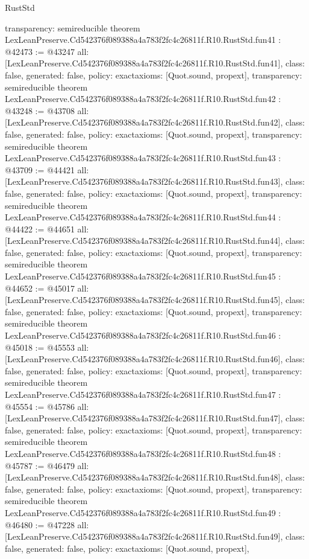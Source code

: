 \begin{lexlean}{RustStd}
\begin{coremodule}
{  transparency: semireducible
}
theorem LexLeanPreserve.Cd542376f089388a4a783f2fc4c26811f.R10.RustStd.fun41 : @42473 := @43247 {
  all: [LexLeanPreserve.Cd542376f089388a4a783f2fc4c26811f.R10.RustStd.fun41],
  class: false,
  generated: false,
  policy: exact{axioms: [Quot.sound, propext]},
  transparency: semireducible
}
theorem LexLeanPreserve.Cd542376f089388a4a783f2fc4c26811f.R10.RustStd.fun42 : @43248 := @43708 {
  all: [LexLeanPreserve.Cd542376f089388a4a783f2fc4c26811f.R10.RustStd.fun42],
  class: false,
  generated: false,
  policy: exact{axioms: [Quot.sound, propext]},
  transparency: semireducible
}
theorem LexLeanPreserve.Cd542376f089388a4a783f2fc4c26811f.R10.RustStd.fun43 : @43709 := @44421 {
  all: [LexLeanPreserve.Cd542376f089388a4a783f2fc4c26811f.R10.RustStd.fun43],
  class: false,
  generated: false,
  policy: exact{axioms: [Quot.sound, propext]},
  transparency: semireducible
}
theorem LexLeanPreserve.Cd542376f089388a4a783f2fc4c26811f.R10.RustStd.fun44 : @44422 := @44651 {
  all: [LexLeanPreserve.Cd542376f089388a4a783f2fc4c26811f.R10.RustStd.fun44],
  class: false,
  generated: false,
  policy: exact{axioms: [Quot.sound, propext]},
  transparency: semireducible
}
theorem LexLeanPreserve.Cd542376f089388a4a783f2fc4c26811f.R10.RustStd.fun45 : @44652 := @45017 {
  all: [LexLeanPreserve.Cd542376f089388a4a783f2fc4c26811f.R10.RustStd.fun45],
  class: false,
  generated: false,
  policy: exact{axioms: [Quot.sound, propext]},
  transparency: semireducible
}
theorem LexLeanPreserve.Cd542376f089388a4a783f2fc4c26811f.R10.RustStd.fun46 : @45018 := @45553 {
  all: [LexLeanPreserve.Cd542376f089388a4a783f2fc4c26811f.R10.RustStd.fun46],
  class: false,
  generated: false,
  policy: exact{axioms: [Quot.sound, propext]},
  transparency: semireducible
}
theorem LexLeanPreserve.Cd542376f089388a4a783f2fc4c26811f.R10.RustStd.fun47 : @45554 := @45786 {
  all: [LexLeanPreserve.Cd542376f089388a4a783f2fc4c26811f.R10.RustStd.fun47],
  class: false,
  generated: false,
  policy: exact{axioms: [Quot.sound, propext]},
  transparency: semireducible
}
theorem LexLeanPreserve.Cd542376f089388a4a783f2fc4c26811f.R10.RustStd.fun48 : @45787 := @46479 {
  all: [LexLeanPreserve.Cd542376f089388a4a783f2fc4c26811f.R10.RustStd.fun48],
  class: false,
  generated: false,
  policy: exact{axioms: [Quot.sound, propext]},
  transparency: semireducible
}
theorem LexLeanPreserve.Cd542376f089388a4a783f2fc4c26811f.R10.RustStd.fun49 : @46480 := @47228 {
  all: [LexLeanPreserve.Cd542376f089388a4a783f2fc4c26811f.R10.RustStd.fun49],
  class: false,
  generated: false,
  policy: exact{axioms: [Quot.sound, propext]},
}
\end{coremodule}
\end{lexlean}
